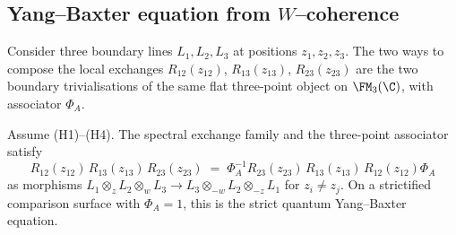 \subsection{Yang–Baxter equation from $W$–coherence}
Consider three boundary lines $L_1,L_2,L_3$ at positions $z_1,z_2,z_3$.
The two ways to compose the local exchanges
$R_{12}(z_{12})$, $R_{13}(z_{13})$, $R_{23}(z_{23})$ are the two
boundary trivialisations of the same flat three-point object on
$\FM_3(\C)$, with associator \(\Phi_A\).

\begin{theorem}
Assume \textrm{(H1)--(H4)}.
The spectral exchange family and the three-point associator satisfy
\[
R_{12}(z_{12})\,R_{13}(z_{13})\,R_{23}(z_{23})
\;=\;
\Phi_A^{-1}R_{23}(z_{23})\,R_{13}(z_{13})\,R_{12}(z_{12})\Phi_A
\]
as morphisms $L_1\otimes_z L_2\otimes_w L_3 \to
L_3\otimes_{-w}L_2\otimes_{-z}L_1$ for $z_i\neq z_j$. On a strictified
comparison surface with \(\Phi_A=1\), this is the strict quantum
Yang--Baxter equation.
\end{theorem}


